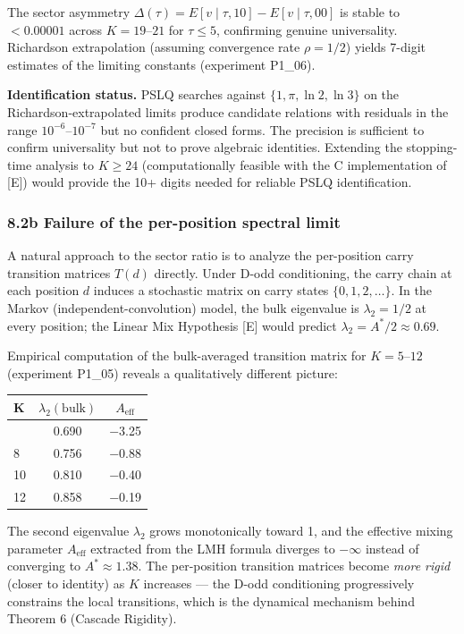 \documentclass[
  11pt,
]{article}
\begin{document}
The sector asymmetry \(\Delta(\tau) = E[v\mid\tau,10] - E[v\mid\tau,00]\) is
stable to \(< 0.00001\) across \(K = 19\)--\(21\) for \(\tau \leq 5\),
confirming genuine universality. Richardson extrapolation (assuming convergence
rate \(\rho = 1/2\)) yields 7-digit estimates of the limiting constants
(experiment P1\_06).

\textbf{Identification status.} PSLQ searches against
\(\lbrace{}1, \pi, \ln 2, \ln 3\rbrace{}\) on the Richardson-extrapolated limits
produce candidate relations with residuals in the range \(10^{-6}\)--\(10^{-7}\)
but no confident closed forms. The precision is sufficient to confirm
universality but not to prove algebraic identities. Extending the stopping-time
analysis to \(K \geq 24\) (computationally feasible with the C implementation of
{[}E{]}) would provide the 10+ digits needed for reliable PSLQ identification.

\subsubsection{8.2b Failure of the per-position spectral
limit}\label{b-failure-of-the-per-position-spectral-limit}

A natural approach to the sector ratio is to analyze the per-position carry
transition matrices \(T(d)\) directly. Under D-odd conditioning, the carry chain
at each position \(d\) induces a stochastic matrix on carry states
\(\lbrace{}0, 1, 2, \ldots\rbrace{}\). In the Markov (independent-convolution)
model, the bulk eigenvalue is \(\lambda_2 = 1/2\) at every position; the Linear
Mix Hypothesis {[}E{]} would predict \(\lambda_2 = A^{\ast}/2 \approx 0.69\).

Empirical computation of the bulk-averaged transition matrix for
\(K = 5\)--\(12\) (experiment P1\_05) reveals a qualitatively different picture:

\begin{longtable}[]{@{}lcc@{}}
\toprule\noalign{}
K & \(\lambda_2(\text{bulk})\) & \(A_{\text{eff}}\) \\
\midrule\noalign{}
\endhead
\bottomrule\noalign{}
\endlastfoot
6 & 0.690 & −3.25 \\
8 & 0.756 & −0.88 \\
10 & 0.810 & −0.40 \\
12 & 0.858 & −0.19 \\
\end{longtable}

The second eigenvalue \(\lambda_2\) grows monotonically toward 1, and the
effective mixing parameter \(A_{\text{eff}}\) extracted from the LMH formula
diverges to \(-\infty\) instead of converging to \(A^{\ast} \approx 1.38\). The
per-position transition matrices become \emph{more rigid} (closer to identity)
as \(K\) increases --- the D-odd conditioning progressively constrains the local
transitions, which is the dynamical mechanism behind Theorem 6 (Cascade
Rigidity).
\end{document}
